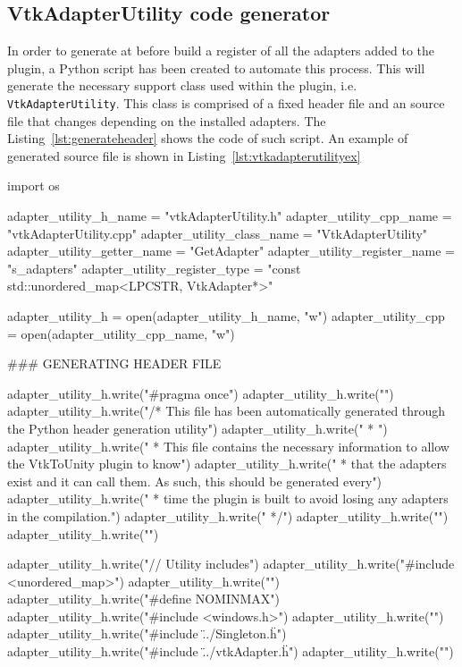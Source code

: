 \begin{appendices}
\chapter{VtkAdapterUtility code generator}
\label{apx:generate-register}
	
In order to generate at before build a register of all the adapters added to the plugin, a Python script has been created to automate this process. This will generate the necessary support class used within the plugin, i.e. \verb|VtkAdapterUtility|. This class is comprised of a fixed header file and an source file that changes depending on the installed adapters. The Listing~\ref{lst:generateheader} shows the code of such script. An example of generated source file is shown in Listing~\ref{lst:vtkadapterutilityex}

\begin{python}[label=lst:generateheader,caption={generate-header.py script},aboveskip=20pt]
import os

adapter_utility_h_name = "vtkAdapterUtility.h"
adapter_utility_cpp_name = "vtkAdapterUtility.cpp"
adapter_utility_class_name = "VtkAdapterUtility"
adapter_utility_getter_name = "GetAdapter"
adapter_utility_register_name = "s_adapters"
adapter_utility_register_type = "const std::unordered_map<LPCSTR, VtkAdapter*>"

adapter_utility_h = open(adapter_utility_h_name, "w")
adapter_utility_cpp = open(adapter_utility_cpp_name, "w")



### GENERATING HEADER FILE

adapter_utility_h.write("#pragma once\n")
adapter_utility_h.write("\n")
adapter_utility_h.write("/* This file has been automatically generated through the Python header generation utility\n")
adapter_utility_h.write(" * \n")
adapter_utility_h.write(" * This file contains the necessary information to allow the VtkToUnity plugin to know\n")
adapter_utility_h.write(" * that the adapters exist and it can call them. As such, this should be generated every\n")
adapter_utility_h.write(" * time the plugin is built to avoid losing any adapters in the compilation.\n")
adapter_utility_h.write(" */\n")
adapter_utility_h.write("\n")
adapter_utility_h.write("\n")

adapter_utility_h.write("// Utility includes\n")
adapter_utility_h.write("#include <unordered_map>\n")
adapter_utility_h.write("\n")
adapter_utility_h.write("#define NOMINMAX\n")
adapter_utility_h.write("#include <windows.h>\n")
adapter_utility_h.write("\n")
adapter_utility_h.write("#include \"../Singleton.h\"\n")
adapter_utility_h.write("#include \"../vtkAdapter.h\"\n")
adapter_utility_h.write("\n")



\end{python}
\end{appendices}
